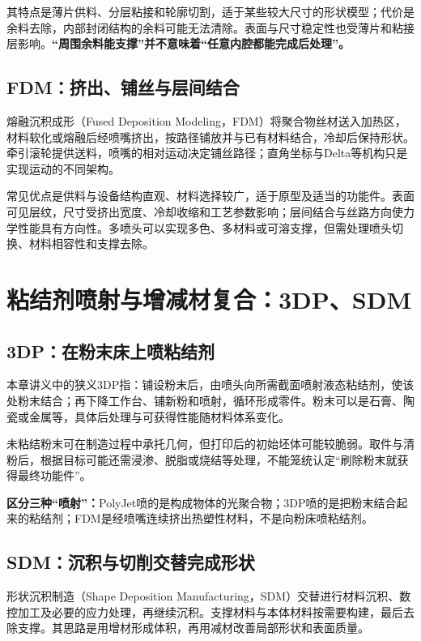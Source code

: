 其特点是薄片供料、分层粘接和轮廓切割，适于某些较大尺寸的形状模型；代价是余料去除，内部封闭结构的余料可能无法清除。表面与尺寸稳定性也受薄片和粘接层影响。\textbf{“周围余料能支撑”并不意味着“任意内腔都能完成后处理”。}

\subsection{FDM：挤出、铺丝与层间结合}
熔融沉积成形（Fused Deposition Modeling，FDM）将聚合物丝材送入加热区，材料软化或熔融后经喷嘴挤出，按路径铺放并与已有材料结合，冷却后保持形状。牵引滚轮提供送料，喷嘴的相对运动决定铺丝路径；直角坐标与Delta等机构只是实现运动的不同架构。

常见优点是供料与设备结构直观、材料选择较广，适于原型及适当的功能件。表面可见层纹，尺寸受挤出宽度、冷却收缩和工艺参数影响；层间结合与丝路方向使力学性能具有方向性。多喷头可以实现多色、多材料或可溶支撑，但需处理喷头切换、材料相容性和支撑去除。


\section{粘结剂喷射与增减材复合：3DP、SDM}
\subsection{3DP：在粉末床上喷粘结剂}
本章讲义中的狭义3DP指：铺设粉末后，由喷头向所需截面喷射液态粘结剂，使该处粉末结合；再下降工作台、铺新粉和喷射，循环形成零件。粉末可以是石膏、陶瓷或金属等，具体后处理与可获得性能随材料体系变化。

未粘结粉末可在制造过程中承托几何，但打印后的初始坯体可能较脆弱。取件与清粉后，根据目标可能还需浸渗、脱脂或烧结等处理，不能笼统认定“刷除粉末就获得最终功能件”。

\textbf{区分三种“喷射”：}PolyJet喷的是构成物体的光聚合物；3DP喷的是把粉末结合起来的粘结剂；FDM是经喷嘴连续挤出热塑性材料，不是向粉床喷粘结剂。

\subsection{SDM：沉积与切削交替完成形状}
形状沉积制造（Shape Deposition Manufacturing，SDM）交替进行材料沉积、数控加工及必要的应力处理，再继续沉积。支撑材料与本体材料按需要构建，最后去除支撑。其思路是用增材形成体积，再用减材改善局部形状和表面质量。

